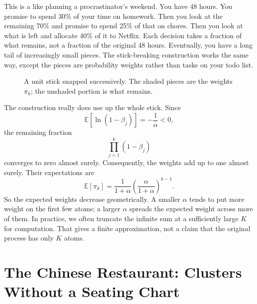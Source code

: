 \documentclass[11pt]{article}
\begin{document}
This is a like planning a procrastinator's weekend. You have 48 hours. You promise to spend 30\% of your time on homework. Then you look at the remaining 70\% and promise to spend 25\% of that on chores. Then you look at what is left and allocate 40\% of it to Netflix. Each decision takes a fraction of what remains, not a fraction of the original 48 hours. Eventually, you have a long tail of increasingly small pieces. The stick-breaking construction works the same way, except the pieces are probability weights rather than tasks on your todo list.

\begin{figure}[htbp]
\centering
{}
\caption{A unit stick snapped successively. The shaded pieces are the weights \(\pi_k\); the unshaded portion is what remains.}
\label{fig:stick}
\end{figure}

The construction really does use up the whole stick. Since
\[
\mathbb{E}[\ln(1-\beta_j)]=-\frac{1}{\alpha}<0,
\]
the remaining fraction
\[
\prod_{j=1}^{k}(1-\beta_j)
\]
converges to zero almost surely. Consequently, the weights add up to one almost surely. Their expectations are
\[
\mathbb{E}[\pi_k]
=
\frac{1}{1+\alpha}
\left(\frac{\alpha}{1+\alpha}\right)^{k-1}.
\]
So the expected weights decrease geometrically. A smaller \(\alpha\) tends to put more weight on the first few atoms; a larger \(\alpha\) spreads the expected weight across more of them. In practice, we often truncate the infinite sum at a sufficiently large \(K\) for computation. That gives a finite approximation, not a claim that the original process has only \(K\) atoms.

\section*{The Chinese Restaurant: Clusters Without a Seating Chart}
\end{document}
